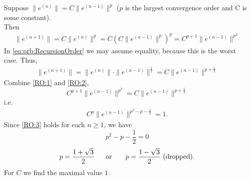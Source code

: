 \begin{problem}
\begin{subproblem}[4]
\begin{solution}
Suppose $\|e^{(n)}\|=C \|e^{(n-1)}\|^{p}$ ($p$ is the largest convergence order and C is some constant).\\
Then
\begin{gather}
  \label{RO:1}
  \|e^{(n+1)}\|=C\|e^{(n)}\|^{p}
  =C(C\|e^{(n-1)}\|^p)^{p}
  =C^{p+1}\|e^{(n-1)}\|^{p^2}
\end{gather}
In \eqref{eq:prb:RecursionOrder} we may assume equality, because this is the worst case.
Thus,
\begin{gather}
  \label{RO:2}
\|e^{(n+1)}\| = \|e^{(n)}\|\cdot \|e^{(n-1)}\|^\frac{1}{2}
=C\|e^{(n-1)}\|^{p+\frac{1}{2}}
\end{gather}
Combine \eqref{RO:1} and \eqref{RO:2},
$$C^{p+1}\|e^{(n-1)}\|^{p^2} = C\|e^{(n-1)}\|^{p+\frac{1}{2}}$$
i.e.
 \begin{gather}
   \label{RO:3}
 C^{p}\|e^{(n-1)}\|^{p^2-p-\frac{1}{2}} = 1.
 \end{gather}
Since \eqref{RO:3} holds for each $n\geq 1$, we have \\
$$p^2-p-\frac{1}{2}=0$$
$$p=\frac{1+\sqrt{3}}{2} ~~~~~{\rm or}~~~~~~p=\frac{1-\sqrt{3}}{2}~
{\rm(dropped)}.$$
For $C$ we find the maximal value $1$.
 \end{solution}
  \end{subproblem}
  \end{problem}